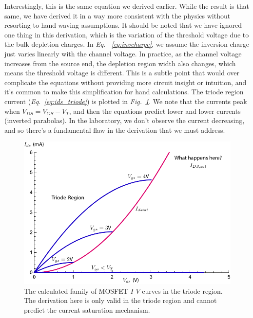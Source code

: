 Interestingly, this is the same equation we derived earlier.  While the result is that same, we have derived it in a way more consistent with the physics without resorting to hand-waving assumptions.  It should be noted that we have ignored one thing in this derivation, which is the variation of the threshold voltage due to the bulk depletion charges.  In \emph{Eq. ~\ref{eq:invcharge}}, we assume the inversion charge just varies linearly with the channel voltage. In practice, as the channel voltage increases from the source end, the depletion region width also changes, which means the threshold voltage is different. This is a subtle point that would over complicate the equations without providing more circuit insight or intuition, and it's common to make this simplification for hand calculations.
The triode region current (\emph{Eq.~\ref{eq:ids_triode}}) is plotted in \emph{\emph{Fig.~\ref{fig:ids_triode_only}}}.  We note that the currents peak when $V_{DS} = V_{GS} - V_T$, and then the equations predict lower and lower currents (inverted parabolas).  In the laboratory, we don't observe the current decreasing, and so there's a fundamental flaw in the derivation that we must address.  
\begin{figure}[tb]
\centering
\includegraphics[width=.75\columnwidth]{ids_triode_only} 
\caption{The calculated family of MOSFET $I$-$V$ curves in the triode region.  The derivation here is only valid in the triode region and cannot predict the current saturation mechanism.}
\label{fig:ids_triode_only}
\end{figure}
